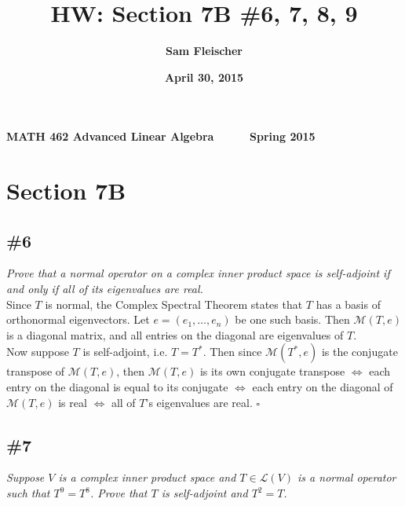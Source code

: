 \documentclass[12pt]{article}
\title{\bf HW: Section 7B \#6, 7, 8, 9}
\author{\bf Sam Fleischer}
\date{\bf April 30, 2015}
\begin{document}
{\bf MATH 462 \hfill Advanced Linear Algebra \ \ \ \ \ \hfill Spring 2015} 

{\let\newpage\relax\maketitle}

\section*{Section 7B}
\subsection*{\#6}
{\it Prove that a normal operator on a complex inner product space is self-adjoint if and only if all of its eigenvalues are real.} \\

\noindent Since $T$ is normal, the Complex Spectral Theorem states that $T$ has a basis of orthonormal eigenvectors.  Let $e = (e_1, \dots, e_n)$ be one such basis.  Then $\mathcal{M}(T, e)$ is a diagonal matrix, and all entries on the diagonal are eigenvalues of $T$. \\

\noindent Now suppose $T$ is self-adjoint, i.e. $T = T^*$.  Then since $\mathcal{M}(T^*, e)$ is the conjugate transpose of $\mathcal{M}(T, e)$, then $\mathcal{M}(T, e)$ is its own conjugate transpose $\iff$ each entry on the diagonal is equal to its conjugate $\iff$ each entry on the diagonal of $\mathcal{M}(T, e)$ is real $\iff$ all of $T$'s eigenvalues are real. \hfill $\square$

\subsection*{\#7}
{\it Suppose $V$ is a complex inner product space and $T \in \mathcal{L}(V)$ is a normal operator such that $T^9 = T^8$.  Prove that $T$ is self-adjoint and $T^2 = T$.} \\
\end{document}
